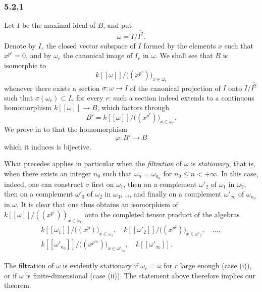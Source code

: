 
\subsubsection*{5.2.1}
\label{sga3:VIIB:5.2.1}

Let \(I\) be the maximal ideal of \(B\), and put
\[
  \omega=I/\overline{I^2}.
\]
Denote by \(I_r\) the closed vector subspace of \(I\) formed by the
elements \(x\) such that \(x^{p^r}=0\), and by \(\omega_r\) the
canonical image of \(I_r\) in \(\omega\).
\label{sga3:VIIB:5.2.1:section-proposition}
We shall see that \(B\) is isomorphic to
\[
  k[[\omega]]
  \big/
  \bigl((x^{p^r})\bigr)_{x\in\omega_r}
\]
whenever there exists a section \(\sigma:\omega\to I\) of the canonical
projection of \(I\) onto \(I/\overline{I^2}\) such that
\(\sigma(\omega_r)\subset I_r\) for every \(r\): such a section indeed
extends to a continuous homomorphism \(k[[\omega]]\to B\), which
factors through
\[
  B'
  =
  k[[\omega]]
  \big/
  \bigl((x^{p^r})\bigr)_{x\in\omega_r}.
\]
We prove in  to  that the homomorphism
\[
  \varphi:B'\longrightarrow B
\]
which it induces is bijective.

What precedes applies in particular when the \emph{filtration} of
\(\omega\) is \emph{stationary}, that is, when there exists an integer
\(n_0\) such that \(\omega_n=\omega_{n_0}\) for \(n_0\leq n<+\infty\).
In this case, indeed, one can construct \(\sigma\) first on
\(\omega_1\), then on a complement \(\omega'_2\) of \(\omega_1\) in
\(\omega_2\), then on a complement \(\omega'_3\) of \(\omega_2\) in
\(\omega_3\), \ldots, and finally on a complement \(\omega'_\infty\) of
\(\omega_{n_0}\) in \(\omega\). It is clear that one thus obtains an
isomorphism of \(k[[\omega]]/((x^{p^r}))_{x\in\omega_r}\) onto the
completed tensor product of the algebras
\[
\begin{gathered}
  k[[\omega_1]]/\bigl((x^p)\bigr)_{x\in\omega_1},\quad
  k[[\omega'_2]]/\bigl((x^{p^2})\bigr)_{x\in\omega'_2},\quad\ldots,
  \\
  k[[\omega'_{n_0}]]/\bigl((x^{p^{n_0}})\bigr)_{x\in\omega'_{n_0}},\quad
  k[[\omega'_\infty]].
\end{gathered}
\]

The filtration of \(\omega\) is evidently stationary if
\(\omega_r=\omega\) for \(r\) large enough (case \textup{(i)}), or if
\(\omega\) is finite-dimensional (case \textup{(ii)}). The statement
above therefore implies our theorem.

